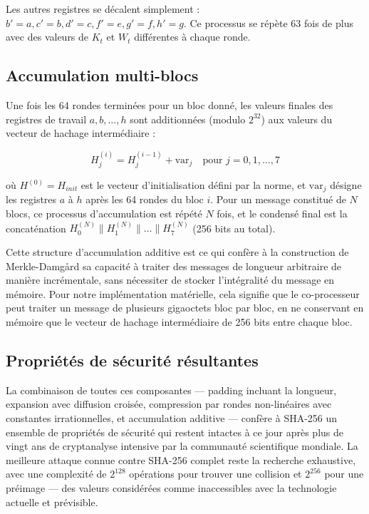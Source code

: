 Les autres registres se décalent simplement : $b' = a, c' = b, d' = c, f' = e, g' = f, h' = g$. Ce processus se répète 63 fois de plus avec des valeurs de $K_t$ et $W_t$ différentes à chaque ronde.

\subsection{Accumulation multi-blocs}

Une fois les 64 rondes terminées pour un bloc donné, les valeurs finales des registres de travail $a, b, \ldots, h$ sont additionnées (modulo $2^{32}$) aux valeurs du vecteur de hachage intermédiaire :

\begin{equation}
H^{(i)}_j = H^{(i-1)}_j + \text{var}_j \quad \text{pour } j = 0, 1, \ldots, 7
\label{eq:accum}
\end{equation}

où $H^{(0)} = H_{init}$ est le vecteur d'initialisation défini par la norme, et $\text{var}_j$ désigne les registres $a$ à $h$ après les 64 rondes du bloc $i$. Pour un message constitué de $N$ blocs, ce processus d'accumulation est répété $N$ fois, et le condensé final est la concaténation $H^{(N)}_0 \| H^{(N)}_1 \| \ldots \| H^{(N)}_7$ (256 bits au total).

Cette structure d'accumulation additive est ce qui confère à la construction de Merkle-Damgård sa capacité à traiter des messages de longueur arbitraire de manière incrémentale, sans nécessiter de stocker l'intégralité du message en mémoire. Pour notre implémentation matérielle, cela signifie que le co-processeur peut traiter un message de plusieurs gigaoctets bloc par bloc, en ne conservant en mémoire que le vecteur de hachage intermédiaire de 256 bits entre chaque bloc.

\subsection{Propriétés de sécurité résultantes}

La combinaison de toutes ces composantes --- padding incluant la longueur, expansion avec diffusion croisée, compression par rondes non-linéaires avec constantes irrationnelles, et accumulation additive --- confère à SHA-256 un ensemble de propriétés de sécurité qui restent intactes à ce jour après plus de vingt ans de cryptanalyse intensive par la communauté scientifique mondiale. La meilleure attaque connue contre SHA-256 complet reste la recherche exhaustive, avec une complexité de $2^{128}$ opérations pour trouver une collision et $2^{256}$ pour une préimage --- des valeurs considérées comme inaccessibles avec la technologie actuelle et prévisible.

